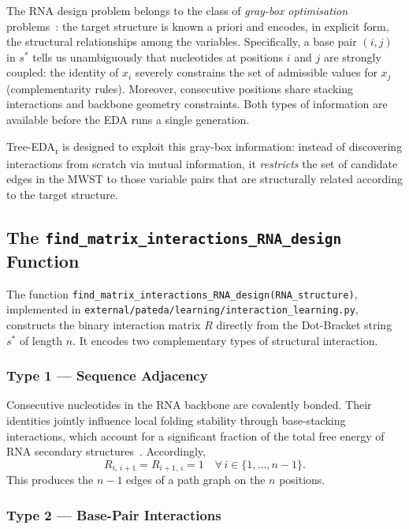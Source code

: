 \documentclass[11pt,a4paper]{article}
\begin{document}
The RNA design problem belongs to the class of \emph{gray-box optimisation}
problems~\cite{santana2017graybox}: the target structure is known a priori
and encodes, in explicit form, the structural relationships among the
variables. Specifically, a base pair $(i, j)$ in $s^*$ tells us unambiguously
that nucleotides at positions $i$ and $j$ are strongly coupled: the identity
of $x_i$ severely constrains the set of admissible values for $x_j$
(complementarity rules). Moreover, consecutive positions share stacking
interactions and backbone geometry constraints. Both types of information
are available before the EDA runs a single generation.

Tree-EDA\textsubscript{r} is designed to exploit this gray-box information:
instead of discovering interactions from scratch via mutual information, it
\emph{restricts} the set of candidate edges in the MWST to those variable
pairs that are structurally related according to the target structure.

\subsection{The \texttt{find\_matrix\_interactions\_RNA\_design} Function}

The function \texttt{find\_matrix\_interactions\_RNA\_design(RNA\_structure)},
implemented in \texttt{external/pateda/learning/interaction\_learning.py},
constructs the binary interaction matrix $R$ directly from the Dot-Bracket
string $s^*$ of length $n$. It encodes two complementary types of structural
interaction.

\subsubsection*{Type 1 — Sequence Adjacency}

Consecutive nucleotides in the RNA backbone are covalently bonded.
Their identities jointly influence local folding stability through
base-stacking interactions, which account for a significant fraction of
the total free energy of RNA secondary structures~\cite{mathews2004thermodynamics}. Accordingly,
\[
  R_{i,\,i+1} = R_{i+1,\,i} = 1 \quad \forall\, i \in \{1, \ldots, n-1\}.
\]
This produces the $n-1$ edges of a path graph on the $n$ positions.

\subsubsection*{Type 2 — Base-Pair Interactions}
\end{document}
